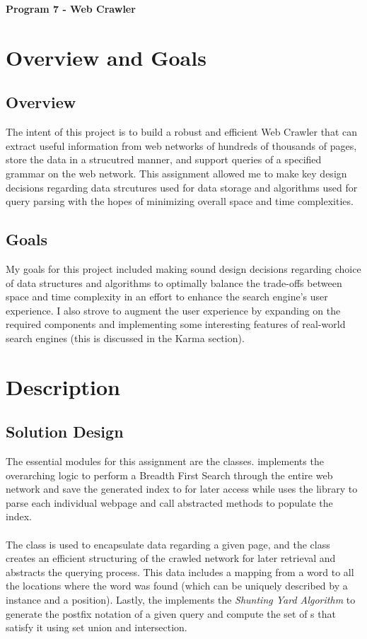 \documentclass[11pt]{article}
\begin{document}
 
\begin{center}
    \huge\textbf{Program 7 - Web Crawler}
\end{center}

\section{Overview and Goals}
\subsection{Overview}
The intent of this project is to build a robust and efficient Web Crawler that can extract useful information from web networks of hundreds of thousands of pages, store the data in a strucutred manner, and support queries of a specified grammar on the web network. This assignment allowed me to make key design decisions regarding data strcutures used for data storage and algorithms used for query parsing with the hopes of minimizing overall space and time complexities. 

\subsection{Goals}
My goals for this project included making sound design decisions regarding choice of data structures and algorithms to optimally balance the trade-offs between space and time complexity in an effort to enhance the search engine's user experience. I also strove to augment the user experience by expanding on the required components and implementing some interesting features of real-world search engines (this is discussed in the Karma section). 

\section{Description}
\subsection{Solution Design}
The essential modules for this assignment are the \all{} classes.
\WC{} implements the overarching logic to perform a Breadth First Search through the entire web network and save the generated index to \idb{} for later access while \CMH{} uses the \ap{} library to parse each individual webpage and call abstracted methods to populate the index. \\ \\
The \Page{} class is used to encapsulate data regarding a given page, and the \WI{} class creates an efficient structuring of the crawled network for later retrieval and abstracts the querying process. This data includes a mapping from a word to all the locations where the word was found (which can be uniquely described by a \Page instance and a position). Lastly, the \WQE{} implements the \textit{Shunting Yard Algorithm} to generate the postfix notation of a given query and compute the set of \Page s that satisfy it using set union and intersection.
\end{document}
